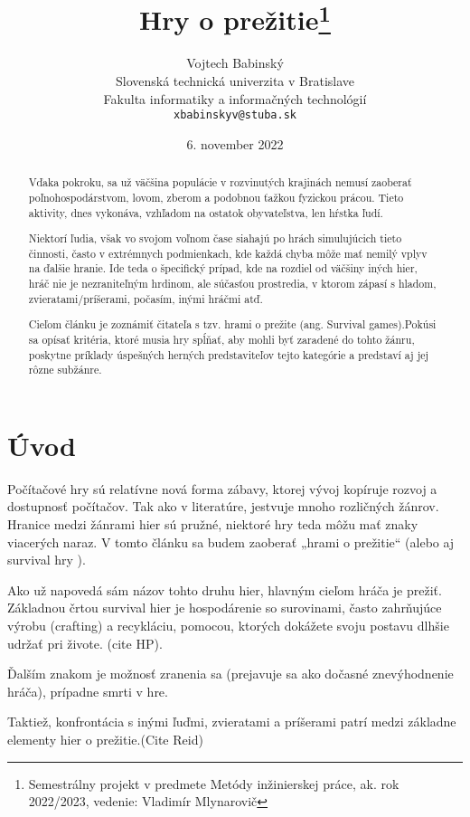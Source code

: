 \documentclass[10pt,twoside,slovak,a4paper]{article}
\title{Hry o prežitie\thanks{Semestrálny projekt v predmete Metódy inžinierskej práce, ak. rok 2022/2023, vedenie: Vladimír Mlynarovič}} %
\author{Vojtech Babinský\\[2pt]
	{\small Slovenská technická univerzita v Bratislave}\\
	{\small Fakulta informatiky a informačných technológií}\\
	{\small \texttt{xbabinskyv@stuba.sk}}
	}
\date{\small 6. november 2022} %
\begin{document}
\maketitle

\begin{abstract}

Vďaka pokroku, sa už väčšina populácie v rozvinutých krajinách nemusí zaoberať poľnohospodárstvom, lovom, zberom a podobnou ťažkou fyzickou prácou. Tieto aktivity, dnes vykonáva, vzhľadom na ostatok obyvateľstva, len hŕstka ľudí. 

Niektorí ľudia, však vo svojom voľnom čase siahajú po hrách simulujúcich tieto činnosti, často v extrémnych podmienkach, kde každá chyba môže mať nemilý vplyv na ďalšie hranie. Ide teda o špecifický prípad, kde na rozdiel od väčšiny iných hier, hráč nie je nezraniteľným hrdinom, ale súčasťou prostredia, v ktorom zápasí s hladom, zvieratami/príšerami, počasím, inými hráčmi atď. 

Cieľom článku je zoznámiť čitateľa s tzv. hrami o prežite (ang. Survival games).Pokúsi sa opísať kritéria, ktoré musia hry spĺňať, aby mohli byť zaradené do tohto žánru, poskytne príklady  úspešných herných predstaviteľov tejto kategórie a predstaví aj jej rôzne subžánre. 
\end{abstract}


\newpage


\section{Úvod}
Počítačové hry sú relatívne nová forma zábavy, ktorej vývoj kopíruje rozvoj a dostupnosť počítačov. Tak ako v literatúre, jestvuje mnoho rozličných žánrov. Hranice medzi žánrami hier sú pružné, niektoré hry teda môžu mať znaky viacerých naraz. V tomto článku sa budem zaoberať „hrami o prežitie“ (alebo aj survival hry ). 

Ako už napovedá sám názov tohto druhu hier, hlavným cieľom hráča je prežiť. Základnou črtou survival hier je hospodárenie so surovinami, často zahrňujúce výrobu (crafting) a recykláciu, pomocou, ktorých dokážete svoju postavu dlhšie udržať pri živote. (cite HP). 

Ďalším znakom je možnosť zranenia sa (prejavuje sa ako dočasné znevýhodnenie hráča), prípadne smrti v hre. 

Taktiež, konfrontácia s inými ľuďmi, zvieratami a príšerami patrí medzi základne elementy hier o prežitie.(Cite Reid)
\end{document}
